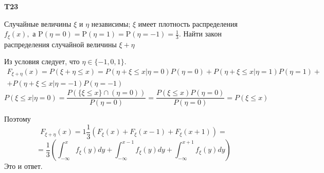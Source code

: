\documentclass[a4paper,12pt]{article} %
\begin{document}
\begin{example}\textbf{T23}

Случайные величины $\xi$ и $\eta$ независимы; $\xi$ имеет плотность распределения $f_{\xi}(x),$ а 
$\mathrm{P}(\eta=0)=\mathrm{P}(\eta=1)=\mathrm{P}(\eta=-1)=\frac{1}{3}$. 
Найти закон распределения случайной величины $\xi+\eta$

Из условия следует, что $ \eta\in \{-1,0,1 \}. $
%
\begin{multline}
F_{\xi+\eta}(x)=P(\xi+\eta\le x)= P(\eta+\xi\le x|\eta =0) P(\eta=0) +
P(\eta+\xi\le x|\eta =1) P(\eta=1) +\\
+P(\eta+\xi\le x|\eta =-1) P(\eta=-1)
\end{multline}
%
\[ P(\xi\le x| \eta=0) = \frac{P(\{\xi\le x\} \cap(\eta=0) )}{P(\eta=0)} =
\frac{P(\xi\le x) P(\eta=0) }{P(\eta=0)}
= P(\xi\le x)
\]

Поэтому 
\[ F_{\xi+\eta}(x)= 1\frac{1}{3}(F_\xi(x)+F_\xi(x-1)+F_\xi (x+1))=
\]
\[ =\frac{1}{3}(\int_{-\infty}^x f_\xi (y) d y + \int_{-\infty}^{x-1} f_\xi (y) d y + \int_{-\infty}^{x+1} f_\xi (y) d y ) \]
Это и ответ.


\end{example}
\end{document}
